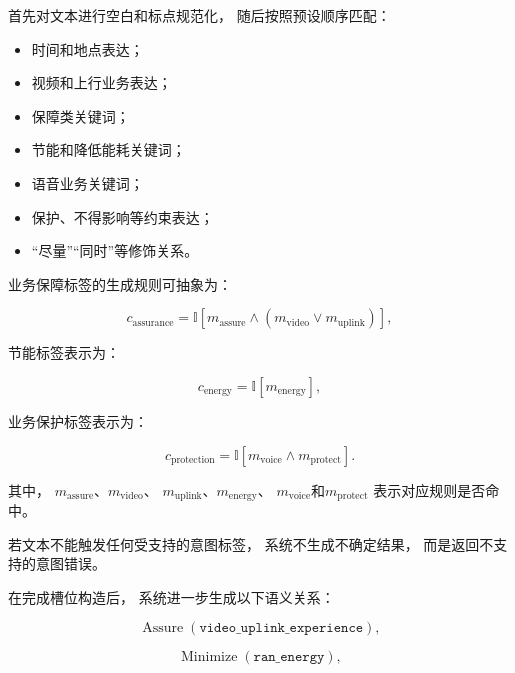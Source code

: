 \documentclass[lang=cn,12pt]{elegantbook}
\begin{document}
首先对文本进行空白和标点规范化，
随后按照预设顺序匹配：

\begin{itemize}
    \item 时间和地点表达；
    \item 视频和上行业务表达；
    \item 保障类关键词；
    \item 节能和降低能耗关键词；
    \item 语音业务关键词；
    \item 保护、不得影响等约束表达；
    \item “尽量”“同时”等修饰关系。
\end{itemize}

业务保障标签的生成规则可抽象为：

\begin{equation}
c_{\mathrm{assurance}}
=
\mathbb{I}
\left[
m_{\mathrm{assure}}
\land
\left(
m_{\mathrm{video}}
\lor
m_{\mathrm{uplink}}
\right)
\right],
\label{eq:service_assurance_detection}
\end{equation}

节能标签表示为：

\begin{equation}
c_{\mathrm{energy}}
=
\mathbb{I}
\left[
m_{\mathrm{energy}}
\right],
\label{eq:energy_intent_detection}
\end{equation}

业务保护标签表示为：

\begin{equation}
c_{\mathrm{protection}}
=
\mathbb{I}
\left[
m_{\mathrm{voice}}
\land
m_{\mathrm{protect}}
\right].
\label{eq:protection_intent_detection}
\end{equation}

其中，
$m_{\mathrm{assure}}$、$m_{\mathrm{video}}$、
$m_{\mathrm{uplink}}$、$m_{\mathrm{energy}}$、
$m_{\mathrm{voice}}$和$m_{\mathrm{protect}}$
表示对应规则是否命中。

若文本不能触发任何受支持的意图标签，
系统不生成不确定结果，
而是返回不支持的意图错误。

在完成槽位构造后，
系统进一步生成以下语义关系：

\begin{equation}
\operatorname{Assure}
\left(
\texttt{video\_uplink\_experience}
\right),
\end{equation}

\begin{equation}
\operatorname{Minimize}
\left(
\texttt{ran\_energy}
\right),
\end{equation}
\end{document}
